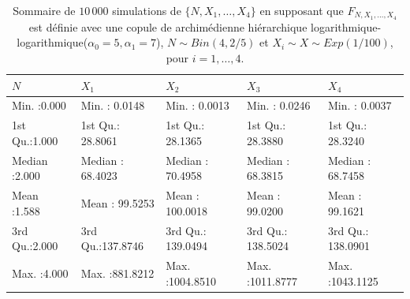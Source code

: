 \documentclass{article}
\begin{document}
		\begin{table}[H]
			\centering
			\begin{tabular}{lllll}
				\hline
				      $N$ 		   &       $X_1$        &       $X_2$         &  $X_3$              &      $X_4$ \\ 
				\hline
				   Min.   :0.000   & Min.   :  0.0148   & Min.   :   0.0013   & Min.   :   0.0246   & Min.   :   0.0037   \\ 
				   1st Qu.:1.000   & 1st Qu.: 28.8061   & 1st Qu.:  28.1365   & 1st Qu.:  28.3880   & 1st Qu.:  28.3240   \\ 
				   Median :2.000   & Median : 68.4023   & Median :  70.4958   & Median :  68.3815   & Median :  68.7458   \\ 
				   Mean   :1.588   & Mean   : 99.5253   & Mean   : 100.0018   & Mean   :  99.0200   & Mean   :  99.1621   \\ 
				   3rd Qu.:2.000   & 3rd Qu.:137.8746   & 3rd Qu.: 139.0494   & 3rd Qu.: 138.5024   & 3rd Qu.: 138.0901   \\ 
				   Max.   :4.000   & Max.   :881.8212   & Max.   :1004.8510   & Max.   :1011.8777   & Max.   :1043.1125   \\ 
				\hline
			\end{tabular}
		\caption[Sommaire des données simulées pour le scénario \ref{scenario_log_log}]{Sommaire de $10\,000$ simulations de $\{N, X_1, \dots, X_4\}$ en supposant que $F_{N,X_1,\dots, X_4}$ est définie avec une copule de archimédienne hiérarchique logarithmique-logarithmique($\alpha_0=5, \alpha_1=7$), $N \sim Bin(4, 2/5)$ et $X_i \sim X \sim Exp(1/100)$, pour $i=1,\dots, 4$.}
		\label{tbl_sommaire_log_log}
		\end{table}
	
\end{document}
